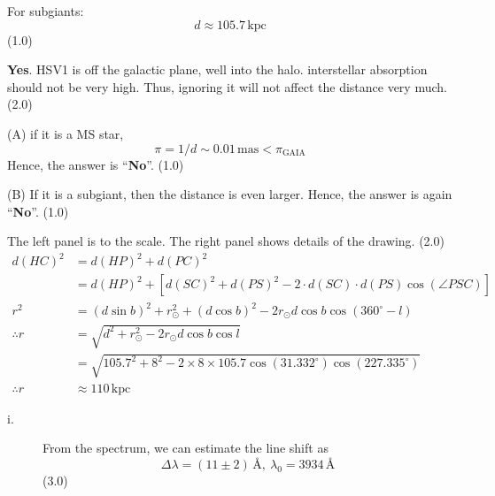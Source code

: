 \begin{description}
\begin{description}
    For subgiants:
    \[
      d \approx 105.7\,\mathrm{kpc}
    \]
    \hfill(1.0)
  \item[iii.] \textbf{Yes}. HSV1 %
    is off the galactic plane, well into the halo. interstellar absorption
    should not be very high. Thus, ignoring it will not affect the distance
    very much. \hfill(2.0)
  \item[iv.] (A) if it is a MS star,
    \[
      \pi = 1/d \sim 0.01\,\mathrm{mas} < \pi_{\mathrm{GAIA}}
    \]
    Hence, the answer is ``\textbf{No}''. \hfill(1.0)

    (B) If it is a subgiant, then the distance is even larger. Hence, the
    answer is again ``\textbf{No}''. \hfill(1.0)
  \item[v.]
    The left panel is to the scale. The right panel shows details of the
    drawing. \hfill(2.0)
    \begin{align*}
      d(HC)^2 &= d(HP)^2 + d(PC)^2\\
        &= d(HP)^2 + \left[d(SC)^2 + d(PS)^2
           - 2\cdot d(SC)\cdot d(PS)\cos(\angle PSC)\right]\\
      r^2 &= (d\sin b)^2 + r_\odot^2 + (d\cos b)^2
           - 2r_\odot d\cos b\cos(360^\circ - l)\\
      \therefore r &= \sqrt{d^2 + r_\odot^2 - 2r_\odot d\cos b\cos l}\\
        &= \sqrt{105.7^2 + 8^2
           - 2\times8\times105.7\cos(31.332^\circ)\cos(227.335^\circ)}\\
      \therefore r &\approx 110\,\mathrm{kpc} \tag*{(4.0)}
    \end{align*}
  \end{description}
\item[(c)] \mbox{}
  \begin{description}
  \item[i.] From the spectrum, we can estimate the line shift as
    \[
      \Delta\lambda = (11\pm2)\,\text{\AA},\ \lambda_0 = 3934\,\text{\AA}
    \]
    \hfill(3.0)


\end{description}
\end{description}
